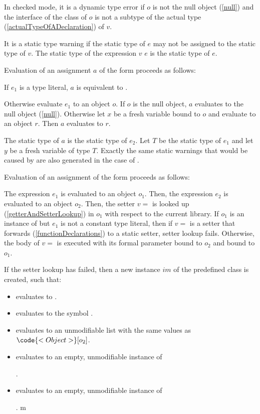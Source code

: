 \documentclass{article}
\begin{document}
\LMHash{}
In checked mode, it is a dynamic type error if $o$ is not the null object (\ref{null}) and the interface of the class of $o$ is not a subtype of the actual type (\ref{actualTypeOfADeclaration}) of $v$.

\LMHash{}
It is a static type warning if the static type of $e$ may not be assigned to the static type of $v$.
The static type of the expression $v$ \code{=} $e$ is the static type of $e$.

\LMHash{}
Evaluation of an assignment $a$ of the form 
proceeds as follows:

\LMHash
If $e_1$ is a type literal, $a$ is equivalent to .

\LMHash{}
Otherwise evaluate $e_1$ to an object $o$.
If $o$ is the null object, $a$ evaluates to the null object (\ref{null}).
Otherwise let $x$ be a fresh variable bound to $o$
and evaluate  to an object $r$.
Then $a$ evaluates to $r$.

\LMHash{}
The static type of $a$ is the static type of $e_2$.
Let $T$ be the static type of $e_1$ and let $y$ be a fresh variable of type $T$.
Exactly the same static warnings that would be caused by  are also generated in the case of .

\LMHash{}
Evaluation of an assignment of the form  proceeds as follows:

\LMHash{}
The expression $e_1$ is evaluated to an object $o_1$.
Then, the expression $e_2$ is evaluated to an object $o_2$.
Then, the setter $v=$ is looked up (\ref{getterAndSetterLookup}) in $o_1$ with respect to the current library.
If $o_1$ is an instance of  but $e_1$ is not a constant type literal,
then if $v=$ is a setter that forwards (\ref{functionDeclarations}) to a static setter, setter lookup fails.
Otherwise, the body of $v=$ is executed with its formal parameter bound to $o_2$ and \THIS{} bound to $o_1$.

\LMHash{}
If the setter lookup has failed, then a new instance $im$ of the predefined class  is created, such that:
\begin{itemize}
\item {} evaluates to \code{\TRUE{}}.
\item {} evaluates to the symbol .
\item {} evaluates to an unmodifiable list with the same values as
$\code{<Object>}[o_2]$.
\item {} evaluates to an empty, unmodifiable instance of

.
\item {} evaluates to an empty, unmodifiable instance of

.
m\end{itemize}
\end{document}
